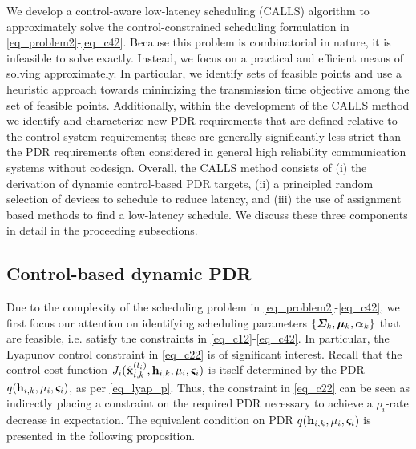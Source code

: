 We develop a control-aware low-latency scheduling (CALLS) algorithm to approximately solve the control-constrained scheduling formulation in \eqref{eq_problem2}-\eqref{eq_c42}. Because this problem is combinatorial in nature, it is infeasible to solve exactly. Instead, we focus on a practical and efficient means of solving approximately. In particular, we identify sets of feasible points and use a heuristic approach towards minimizing the transmission time objective among the set of feasible points. Additionally, within the development of the CALLS method we identify and characterize new PDR requirements that are defined relative to the control system requirements; these are generally significantly less strict than the PDR requirements often considered in general high reliability communication systems without codesign. Overall, the CALLS method consists of (i) the derivation of dynamic control-based PDR targets, (ii) a principled random selection of devices to schedule to reduce latency, and (iii) the use of assignment based methods to find a low-latency schedule. We discuss these three components in detail in the proceeding subsections. 

\subsection{Control-based dynamic PDR}\label{sec_psr}
Due to the complexity of the scheduling problem in \eqref{eq_problem2}-\eqref{eq_c42}, we first focus our attention on identifying scheduling parameters $\{\boldsymbol{\Sigma}_k, \boldsymbol{\mu}_k, \boldsymbol{\alpha}_k\}$ that are feasible, i.e. satisfy the constraints in \eqref{eq_c12}-\eqref{eq_c42}. In particular, the Lyapunov control constraint in \eqref{eq_c22} is of significant interest. Recall that the control cost function $J_i({\hat{\mathbf x} }^{(l_i)}_{i,k},{\mathbf h}_{i,k},\mu_i,\boldsymbol{\varsigma}_i)$ is itself determined by the PDR $q({\mathbf h}_{i,k},\mu_i,\boldsymbol{\varsigma}_i)$, as per \eqref{eq_lyap_p}. Thus, the constraint in \eqref{eq_c22} can be seen as indirectly placing a constraint on the required PDR necessary to achieve a $\rho_i$-rate decrease in expectation. The equivalent condition on PDR $q({\mathbf h}_{i,k},\mu_i,\boldsymbol{\varsigma}_i)$ is presented in the following proposition.

